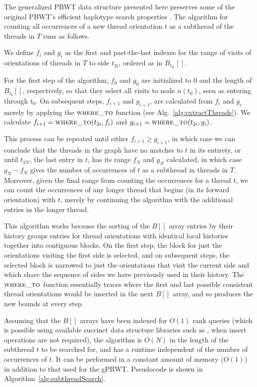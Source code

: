 The generalized PBWT data structure presented here preserves some of the original PBWT's efficient haplotype search properties \cite{durbin2014efficient}. The algorithm for counting all occurrences of a new thread orientation $t$ as a subthread of the threads in $T$ runs as follows.

We define $f_i$ and $g_i$ as the first and past-the-last indexes for the range of visits of orientations of threads in $T$ to side $t_{2i}$, ordered as in $B_{t_{2i}}[]$.

For the first step of the algorithm, $f_0$ and $g_0$ are initialized to $0$ and the length of $B_{t_0}[]$, respectively, so that they select all visits to node $n(t_0)$, seen as entering through $t_0$. On subsequent steps, $f_{i+1}$ and $g_{i+1}$, are calculated from $f_i$ and $g_i$ merely by applying the $\Call{where\_to}{}$ function (see Alg.~\ref{alg:extractThreads}). We calculate $f_{i+1} = \Call{where\_to}{t_{2i}, f_i}$ and $g_{i+1} = \Call{where\_to}{t_{2i}, g_i}$.

This process can be repeated until either $f_{i+1} \geq g_{i+1}$, in which case we can conclude that the threads in the graph have no matches to $t$ in its entirety, or until $t_{2N}$, the last entry in $t$, has its range $f_N$ and $g_N$ calculated, in which case $g_N - f_N$ gives the number of occurrences of $t$ as a subthread in threads in $T$. Moreover, given the final range from counting the occurrences for a thread $t$, we can count the occurrences of any longer thread that begins (in its forward orientation) with $t$, merely by continuing the algorithm with the additional entries in the longer thread.

This algorithm works because the sorting of the $B[]$ array entries by their history groups entries for thread orientations with identical local histories together into contiguous blocks. On the first step, the block for just the orientations visiting the first side is selected, and on subsequent steps, the selected block is narrowed to just the orientations that visit the current side and which share the sequence of sides we have previously used in their history. The $\Call{where\_to}{}$ function essentially traces where the first and last possible consistent thread orientations would be inserted in the next $B[]$ array, and so produces the new bounds at every step.

Assuming that the $B[]$ arrays have been indexed for $O(1)$ rank queries (which is possible using available succinct data structure libraries such as \cite{gog2014theory}, when insert operations are not required), the algorithm is $O(N)$ in the length of the subthread $t$ to be searched for, and has a runtime independent of the number of occurrences of $t$. It can be performed in a constant amount of memory ($O(1)$) in addition to that used for the gPBWT. Pseudocode is shown in Algorithm~\ref{alg:subthreadSearch}.

